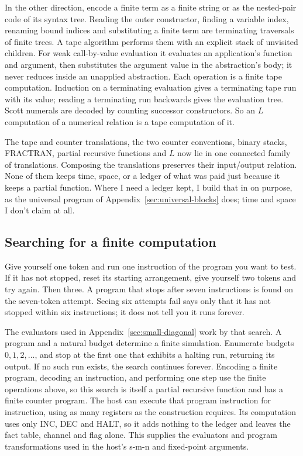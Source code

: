 \documentclass[11pt,twoside]{article}
\theoremstyle{thielethm}
\theoremstyle{thieledef}
\theoremstyle{thieledef}
\theoremstyle{thieledef}
\theoremstyle{thielethm}
\theoremstyle{thieleobs}
\theoremstyle{thielethm}
\begin{document}
In the other direction, encode a finite term as a finite string or as the nested-pair
code of its syntax tree. Reading the outer constructor, finding a variable index,
renaming bound indices and substituting a finite term are terminating traversals of
finite trees. A tape algorithm performs them with an explicit stack of unvisited children.
For weak call-by-value evaluation it evaluates an application's function and argument,
then substitutes the argument value in the abstraction's body; it never reduces inside
an unapplied abstraction. Each operation is a finite tape computation. Induction on
a terminating evaluation gives a terminating tape run with its value; reading a terminating
run backwards gives the evaluation tree. Scott numerals are decoded by counting successor
constructors. So an $L$ computation of a numerical relation is a tape computation of it.

The tape and counter translations, the two counter conventions, binary stacks, FRACTRAN,
partial recursive functions and $L$ now lie in one connected family of translations.
Composing the translations preserves their input/output relation. None of them keeps time,
space, or a ledger of what was paid just because it keeps a partial function. Where I need a ledger
kept, I build that in on purpose, as the universal program of
Appendix~\ref{sec:universal-blocks} does; time and space I don't claim at all.

\subsection{Searching for a finite computation}

Give yourself one token and run one instruction of the program you want to test.
If it has not stopped, reset its starting arrangement, give yourself two tokens
and try again. Then three. A program that stops after seven instructions is found
on the seven-token attempt. Seeing six attempts fail says only that it has not
stopped within six instructions; it does not tell you it runs forever.

The evaluators used in Appendix~\ref{sec:small-diagonal} work by that search. A program
and a natural budget determine a finite simulation. Enumerate budgets
$0,1,2,\ldots$, and stop at the first one that exhibits a halting run, returning its output.
If no such run exists, the search continues forever. Encoding a finite program, decoding
an instruction, and performing one step use the finite operations above, so this search
is itself a partial recursive function and has a finite counter program.
The host can execute that program instruction for instruction, using as many registers
as the construction requires. Its computation uses only INC, DEC and HALT, so it adds nothing to the ledger and leaves the fact table, channel and flag alone. This supplies the evaluators and
program transformations used in the host's s-m-n and fixed-point arguments.
\end{document}
